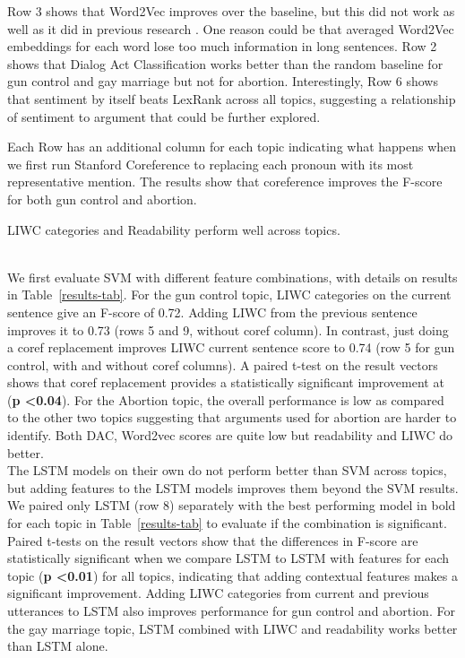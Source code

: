 \documentclass[11pt]{article}
\begin{document}
Row 3 shows that Word2Vec improves over the baseline, but this did not
work as well as it did in previous research
\cite{Habernalemnlp2015}. One reason could be that averaged Word2Vec
embeddings for each word lose too much information in long sentences.
Row 2 shows that Dialog Act Classification works better than the
random baseline for gun control and gay marriage but not for
abortion. Interestingly, Row 6 shows that
sentiment by itself beats LexRank across all topics,
suggesting a relationship of sentiment to argument
that could be further explored. 

Each Row has an additional column for each topic indicating what happens
when we first run Stanford Coreference to 
replacing each pronoun with its most representative mention.
The results show that coreference improves the
F-score for both gun control and abortion. 

LIWC
categories and Readability perform well across topics.
 
 \\
 We first evaluate SVM with different feature combinations, with details on results in Table~\ref{results-tab}. For the gun control topic, LIWC categories on the current sentence give an F-score of 0.72. Adding LIWC from the previous sentence improves it to 0.73 (rows 5 and 9, without coref column). In contrast, just doing a coref replacement improves LIWC current sentence score to 0.74 (row 5 for gun control, with and without coref columns). A paired t-test on the result vectors shows that coref replacement provides a statistically significant improvement at ({\bf  p \textless 0.04}).
For the Abortion topic, the overall performance is low as compared  to the other two topics suggesting that arguments used for abortion are harder to identify. Both DAC, Word2vec  scores are quite low but readability and LIWC do better.\\
The LSTM models on their own do not perform  better than  SVM across topics, but adding features to the LSTM models improves them beyond the SVM  results. We paired only LSTM (row 8) separately with the best performing model in bold for each topic in Table~\ref{results-tab} to evaluate if the combination is significant. Paired t-tests on the result vectors show that the differences in F-score are statistically significant when we compare LSTM to LSTM with features for each topic ({\bf p \textless  0.01}) for all topics, indicating that adding contextual features makes a significant improvement. 
 Adding LIWC categories from current and previous utterances to LSTM also improves performance for gun control and abortion. For the gay marriage topic, LSTM combined with LIWC and readability works better than LSTM alone. 
\end{document}

